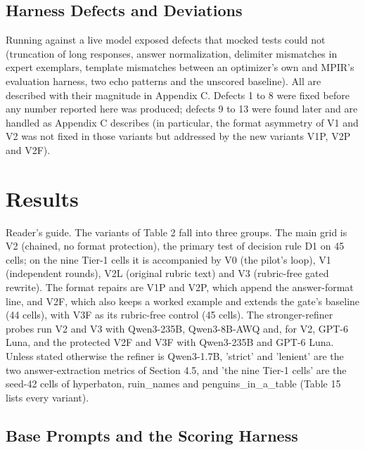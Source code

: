 \documentclass{ieeeaccess}
\begin{document}
\subsection{Harness Defects and Deviations}

Running against a live model exposed defects that mocked tests could not (truncation of long responses, answer normalization, delimiter mismatches in expert exemplars, template mismatches between an optimizer's own and MPIR's evaluation harness, two echo patterns and the unscored baseline). All are described with their magnitude in Appendix C. Defects 1 to 8 were fixed before any number reported here was produced; defects 9 to 13 were found later and are handled as Appendix C describes (in particular, the format asymmetry of V1 and V2 was not fixed in those variants but addressed by the new variants V1P, V2P and V2F).

\section{Results}

Reader's guide. The variants of Table 2 fall into three groups. The main grid is V2 (chained, no format protection), the primary test of decision rule D1 on 45 cells; on the nine Tier-1 cells it is accompanied by V0 (the pilot's loop), V1 (independent rounds), V2L (original rubric text) and V3 (rubric-free gated rewrite). The format repairs are V1P and V2P, which append the answer-format line, and V2F, which also keeps a worked example and extends the gate's baseline (44 cells), with V3F as its rubric-free control (45 cells). The stronger-refiner probes run V2 and V3 with Qwen3-235B, Qwen3-8B-AWQ and, for V2, GPT-6 Luna, and the protected V2F and V3F with Qwen3-235B and GPT-6 Luna. Unless stated otherwise the refiner is Qwen3-1.7B, 'strict' and 'lenient' are the two answer-extraction metrics of Section 4.5, and 'the nine Tier-1 cells' are the seed-42 cells of hyperbaton, ruin\_\allowbreak{}names and penguins\_\allowbreak{}in\_\allowbreak{}a\_\allowbreak{}table (Table 15 lists every variant).

\subsection{Base Prompts and the Scoring Harness}
\end{document}
